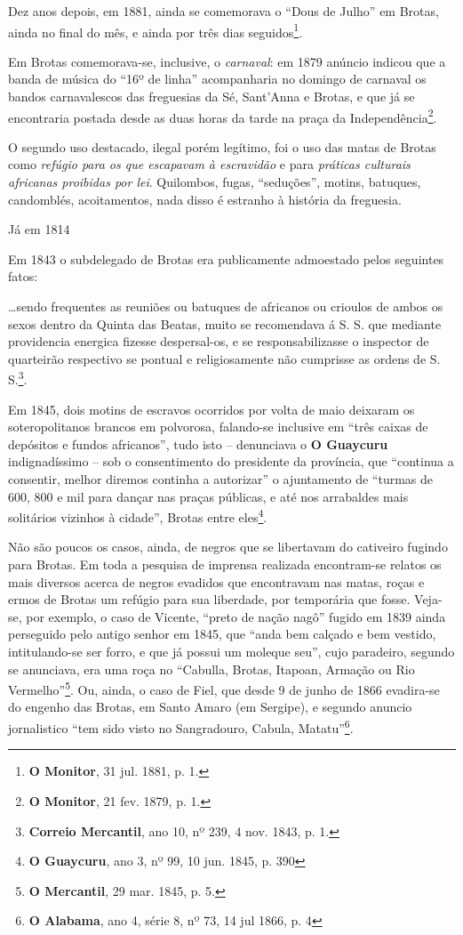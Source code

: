 Dez anos depois, em 1881, ainda se comemorava o ``Dous de Julho'' em Brotas, ainda no final do mês, e ainda por três dias seguidos\footnote{\textbf{O Monitor}, 31 jul. 1881, p. 1.}.

Em Brotas comemorava-se, inclusive, o \textit{carnaval}: em 1879 anúncio indicou que a banda de música do ``16º de linha'' acompanharia no domingo de carnaval os bandos carnavalescos das freguesias da Sé, Sant'Anna e Brotas, e que já se encontraria postada desde as duas horas da tarde na praça da Independência\footnote{\textbf{O Monitor}, 21 fev. 1879, p. 1.}.

O segundo uso destacado, ilegal porém legítimo, foi o uso das matas de Brotas como \textit{refúgio para os que escapavam à escravidão} e para \textit{práticas culturais africanas proibidas por lei}. Quilombos, fugas, ``seduções'', motins, batuques, candomblés, acoitamentos, nada disso é estranho à história da freguesia.

Já em 1814 

Em 1843 o subdelegado de Brotas era publicamente admoestado pelos seguintes fatos:

\begin{citacao}
\dots sendo frequentes as reuniões ou batuques de africanos ou crioulos de ambos os sexos dentro da Quinta das Beatas, muito se recomendava á S. S. que mediante providencia energica fizesse despersal-os, e se responsabilizasse o inspector de quarteirão respectivo se pontual e religiosamente não cumprisse as ordens de S. S.\footnote{\textbf{Correio Mercantil}, ano 10, nº 239, 4 nov. 1843, p. 1.}.
\end{citacao}

Em 1845, dois motins de escravos ocorridos por volta de maio deixaram os soteropolitanos brancos em polvorosa, falando-se inclusive em ``três caixas de depósitos e fundos africanos'', tudo isto -- denunciava o \textbf{O Guaycuru} indignadíssimo -- sob o consentimento do presidente da província, que ``continua a consentir, melhor diremos continha a autorizar'' o ajuntamento de ``turmas de  600, 800 e mil para dançar nas praças públicas, e até nos arrabaldes mais solitários vizinhos à cidade'', Brotas entre eles\footnote{\textbf{O Guaycuru}, ano 3, nº 99, 10 jun. 1845, p. 390}.



Não são poucos os casos, ainda, de negros que se libertavam do cativeiro fugindo para Brotas. Em toda a pesquisa de imprensa realizada encontram-se relatos os mais diversos acerca de negros evadidos que encontravam nas matas, roças e ermos de Brotas um refúgio para sua liberdade, por temporária que fosse. Veja-se, por exemplo, o caso de Vicente, ``preto de nação nagô'' fugido em 1839 ainda perseguido pelo antigo senhor em 1845, que ``anda bem calçado e bem vestido, intitulando-se ser forro, e que já possui um moleque seu'', cujo paradeiro, segundo se anunciava, era uma roça no ``Cabulla, Brotas, Itapoan, Armação ou Rio Vermelho''\footnote{\textbf{O Mercantil}, 29 mar. 1845, p. 5.}. Ou, ainda, o caso de Fiel, que desde 9 de junho de 1866 evadira-se do engenho das Brotas, em Santo Amaro (em Sergipe), e segundo anuncio jornalistico ``tem sido visto no Sangradouro, Cabula, Matatu''\footnote{\textbf{O Alabama}, ano 4, série 8, nº 73, 14 jul 1866, p. 4}.